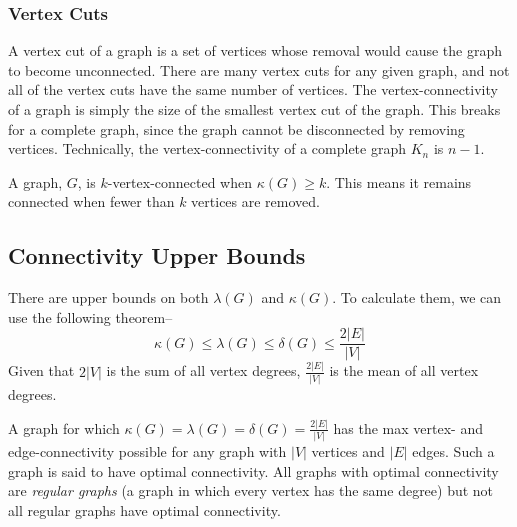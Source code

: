 \subsubsection*{Vertex Cuts}

A vertex cut of a graph is a set of vertices whose removal would cause the graph to become unconnected. There are many
 vertex cuts for any given graph, and not all of the vertex cuts have the same number of vertices. The vertex-connectivity
 of a graph is simply the size of the smallest vertex cut of the graph. This breaks for a complete graph, since the graph
 cannot be disconnected by removing vertices. Technically, the vertex-connectivity of a complete graph $K_n$ is $n - 1$.

A graph, $G$, is $k$-vertex-connected when $\kappa(G) \geq k$. This means it remains connected when fewer than $k$ vertices
 are removed.

\subsection*{Connectivity Upper Bounds}

There are upper bounds on both $\lambda(G)$ and $\kappa(G)$. To calculate them, we can use the following theorem--
\begin{equation*}
  \kappa(G) \leq \lambda(G) \leq \delta(G) \leq \frac{2 \lvert E \rvert}{\lvert V \rvert}
\end{equation*}
Given that $2 \lvert V \rvert$ is the sum of all vertex degrees, $\frac{2 \lvert E \rvert}{\lvert V \rvert}$ is the
 mean of all vertex degrees.

A graph for which $\kappa(G) = \lambda(G) = \delta(G) = \frac{2 \lvert E \rvert}{\lvert V \rvert}$ has the max vertex-
 and edge-connectivity possible for any graph with $\lvert V \rvert$ vertices and $\lvert E \rvert$ edges. Such a graph
 is said to have optimal connectivity. All graphs with optimal connectivity are \textit{regular graphs} (a graph in
 which every vertex has the same degree) but not all regular graphs have optimal connectivity.